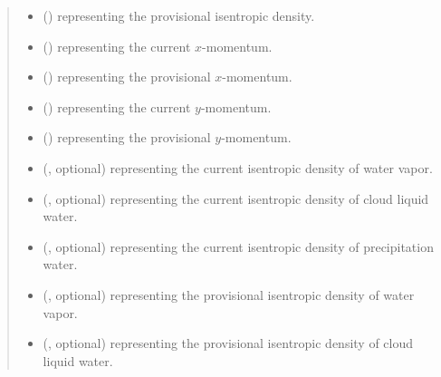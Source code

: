 \documentclass[letterpaper,10pt,english]{sphinxmanual}
\begin{document}
\begin{fulllineitems}
\begin{fulllineitems}
\begin{quote}
\begin{description}
\begin{itemize}
\item {} 
 () \textendash{}  representing the provisional isentropic density.

\item {} 
 () \textendash{}  representing the current \(x\)-momentum.

\item {} 
 () \textendash{}  representing the provisional \(x\)-momentum.

\item {} 
 () \textendash{}  representing the current \(y\)-momentum.

\item {} 
 () \textendash{}  representing the provisional \(y\)-momentum.

\item {} 
 (, optional) \textendash{}  representing the current isentropic density of water vapor.

\item {} 
 (, optional) \textendash{}  representing the current isentropic density of cloud liquid water.

\item {} 
 (, optional) \textendash{}  representing the current isentropic density of precipitation water.

\item {} 
 (, optional) \textendash{}  representing the provisional isentropic density of water vapor.

\item {} 
 (, optional) \textendash{}  representing the provisional isentropic density of cloud liquid water.


\end{itemize}
\end{description}
\end{quote}
\end{fulllineitems}
\end{fulllineitems}
\end{document}
